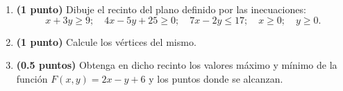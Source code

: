 
\begin{enumerate}[label=\alph*)]
\item \textbf{(1 punto)} Dibuje el recinto del plano definido por las inecuaciones:
\[
x+3y\geq9;\quad4x-5y+25\geq0;\quad7x-2y\leq17;\quad x\geq0;\quad y\geq0.
\]
\item \textbf{(1 punto)} Calcule los vértices del mismo.
\item \textbf{(0.5 puntos)} Obtenga en dicho recinto los valores máximo y mínimo de la función $F(x,y)=2x-y+6$ y los puntos donde se alcanzan.
\end{enumerate}
